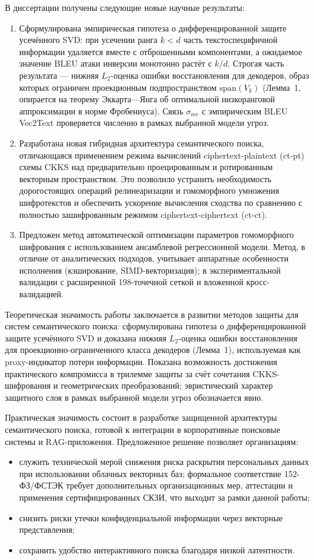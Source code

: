 \documentclass[a4paper, 12pt, oneside, openany]{article}
\begin{document}
В диссертации получены следующие новые научные результаты:
\begin{enumerate}
	\def\labelenumi{\arabic{enumi}.}
	\item
	Сформулирована эмпирическая гипотеза о дифференцированной защите усечённого SVD: при усечении ранга $k < d$ часть текстоспецифичной информации удаляется вместе с отброшенными компонентами, а ожидаемое значение BLEU атаки инверсии монотонно растёт с $k/d$. Строгая часть результата --- нижняя $L_2$-оценка ошибки восстановления для декодеров, образ которых ограничен проекционным подпространством $\mathrm{span}(V_k)$ (Лемма~1, опирается на теорему Эккарта---Янга об оптимальной низкоранговой аппроксимации в норме Фробениуса). Связь $\sigma_{\mathrm{rec}}$ с эмпирическим BLEU Vec2Text проверяется численно в рамках выбранной модели угроз.
	\item
	Разработана новая гибридная архитектура семантического поиска, отличающаяся применением режима вычислений ciphertext-plaintext (ct-pt) схемы CKKS над предварительно проецированным и ротированным векторным пространством. Это позволило устранить необходимость дорогостоящих операций релинеаризации и гомоморфного умножения шифротекстов и обеспечить ускорение вычисления сходства по сравнению с полностью зашифрованным режимом ciphertext-ciphertext (ct-ct).
	\item
	Предложен метод автоматической оптимизации параметров гомоморфного шифрования с использованием ансамблевой регрессионной модели. Метод, в отличие от аналитических подходов, учитывает аппаратные особенности исполнения (кэширование, SIMD-векторизация); в экспериментальной валидации с расширенной 198-точечной сеткой и вложенной кросс-валидацией.
\end{enumerate}

Теоретическая значимость работы заключается в развитии методов защиты для систем семантического поиска: сформулирована гипотеза о дифференцированной защите усечённого SVD и доказана нижняя $L_2$-оценка ошибки восстановления для проекционно-ограниченного класса декодеров (Лемма~1), используемая как proxy-индикатор потери информации. Показана возможность достижения практического компромисса в трилемме защиты за счёт сочетания CKKS-шифрования и геометрических преобразований; эвристический характер защитного слоя в рамках выбранной модели угроз обозначается явно.

Практическая значимость состоит в разработке защищенной архитектуры семантического поиска, готовой к интеграции в корпоративные поисковые системы и RAG-приложения. Предложенное решение позволяет организациям:
\begin{itemize}
	\item
	служить технической мерой снижения риска раскрытия персональных данных при использовании облачных векторных баз; формальное соответствие 152-ФЗ/ФСТЭК требует дополнительных организационных мер, аттестации и применения сертифицированных СКЗИ, что выходит за рамки данной работы;
	\item
	снизить риски утечки конфиденциальной информации через векторные представления;
	\item
	сохранить удобство интерактивного поиска благодаря низкой латентности.
\end{itemize}
\end{document}
